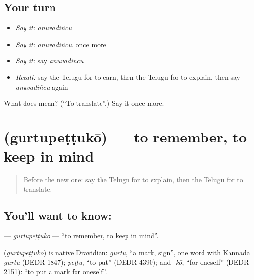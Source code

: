 \subsection*{Your turn}
\begin{itemize}
\raggedright
  \item \emph{Say it:} \emph{anuvadiñcu}
  \item \emph{Say it:} \emph{anuvadiñcu}, once more
  \item \emph{Say it:} say \emph{anuvadiñcu}
  \item \emph{Recall:} say the Telugu for to earn, then the Telugu for to explain, then say \emph{anuvadiñcu} again
\end{itemize}

\begin{tcolorbox}[breakable,colback=teal!4,colframe=teal!35!black,title={Before you move on}]
What does  mean? (\textquotedblleft{}To translate\textquotedblright{}.) Say it once more.
\end{tcolorbox}
\section[\texorpdfstring{\te{గుర్తుపెట్టుకో} (gurtupeṭṭukō)}{గుర్తుపెట్టుకో (gurtupeṭṭukō)}]{ (gurtupeṭṭukō) — to remember, to keep in mind}

\label{lesson:TE-C160-gurtupettuko}



\begin{quote}
Before the new one: say the Telugu for to explain, then the Telugu for to translate.
\end{quote}

\subsection*{You'll want to know: }
\textbf{} — \emph{gurtupeṭṭukō} — \textquotedblleft{}to remember, to keep in mind\textquotedblright{}.

\begin{cousinweb}
\textbf{} (\emph{gurtupeṭṭukō}) is native Dravidian: \emph{gurtu}, \textquotedblleft{}a mark, sign\textquotedblright{}, one word with Kannada \emph{gurtu} (DEDR 1847); \emph{peṭṭu}, \textquotedblleft{}to put\textquotedblright{} (DEDR 4390); and \emph{-kō}, \textquotedblleft{}for oneself\textquotedblright{} (DEDR 2151): \textquotedblleft{}to put a mark for oneself\textquotedblright{}.
\end{cousinweb}

